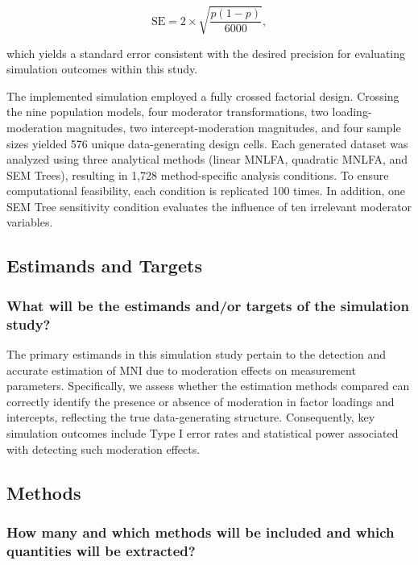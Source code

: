\documentclass[
  man,
  floatsintext]{apa7}
\begin{document}
\[
\text{SE} = 2 \times \sqrt{\frac{p(1-p)}{6000}},
\]

which yields a standard error consistent with the desired precision for
evaluating simulation outcomes within this study.

The implemented simulation employed a fully crossed factorial design.
Crossing the nine population models, four moderator transformations, two
loading-moderation magnitudes, two intercept-moderation magnitudes, and
four sample sizes yielded 576 unique data-generating design cells. Each
generated dataset was analyzed using three analytical methods (linear
MNLFA, quadratic MNLFA, and SEM Trees), resulting in 1,728
method-specific analysis conditions. To ensure computational
feasibility, each condition is replicated 100 times. In addition, one
SEM Tree sensitivity condition evaluates the influence of ten irrelevant
moderator variables.

\subsection{Estimands and Targets}\label{estimands-and-targets}

\subsubsection{What will be the estimands and/or targets of the
simulation
study?}\label{what-will-be-the-estimands-andor-targets-of-the-simulation-study}

The primary estimands in this simulation study pertain to the detection
and accurate estimation of MNI due to moderation effects on measurement
parameters. Specifically, we assess whether the estimation methods
compared can correctly identify the presence or absence of moderation in
factor loadings and intercepts, reflecting the true data-generating
structure. Consequently, key simulation outcomes include Type I error
rates and statistical power associated with detecting such moderation
effects.

\subsection{Methods}\label{methods}

\subsubsection{How many and which methods will be included and which
quantities will be
extracted?}\label{how-many-and-which-methods-will-be-included-and-which-quantities-will-be-extracted}
\end{document}
